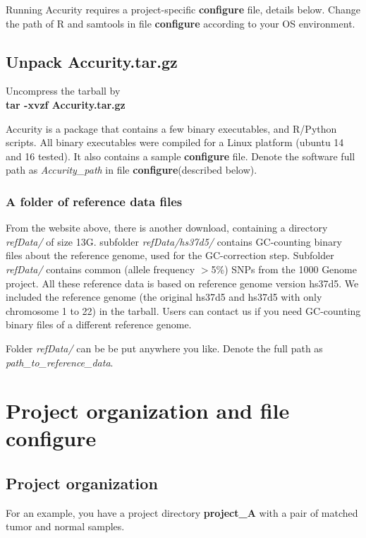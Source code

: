\documentclass{article}
\begin{document}
Running Accurity requires a project-specific \textbf{configure} file, details below. Change the path of R and samtools in file \textbf{configure} according to your OS environment.

\subsection{Unpack Accurity.tar.gz}

Uncompress the tarball by
\ \\
\indent \textbf{tar -xvzf Accurity.tar.gz} \\
\label{sec_aux}

Accurity is a package that contains a few binary executables, and R/Python scripts. All binary executables were compiled for a Linux platform (ubuntu 14 and 16 tested). It also contains a sample \textbf{configure} file. Denote the software full path as \textit{Accurity\_path} in file \textbf{configure}(described below).

\subsubsection{A folder of reference data files}
From the website above, there is another download, containing a directory \textit{refData/} of size 13G. subfolder \textit{refData/hs37d5/} contains GC-counting binary files about the reference genome, used for the GC-correction step. Subfolder \textit{refData/} contains common (allele frequency $>$5\%) SNPs from the 1000 Genome project. All these reference data is based on reference genome version hs37d5. We included the reference genome (the original hs37d5 and hs37d5 with only chromosome 1 to 22) in the tarball. Users can contact us if you need GC-counting binary files of a different reference genome.

Folder \textit{refData/} can be be put anywhere you like. Denote the full path as \textit{path\_to\_reference\_data}.

\section{Project organization and file \textbf{configure}}

\subsection{Project organization}

For an example, you have a project directory \textbf{project\_A} with a pair of matched tumor and normal samples. \\
\end{document}
